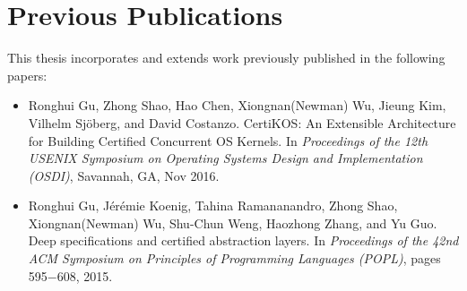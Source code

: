 

\chapter*{Previous Publications}
\thispagestyle{empty}

This thesis incorporates and extends work previously
published in the following papers:

\begin{itemize}

\item Ronghui Gu, Zhong Shao, Hao Chen, Xiongnan(Newman) Wu, Jieung Kim, 
Vilhelm Sj\"{o}berg,
and David Costanzo.
  CertiKOS: An Extensible Architecture for Building Certified
              Concurrent OS Kernels.
  In {\em Proceedings of the 12th USENIX Symposium on Operating Systems
  Design and Implementation (OSDI)}, Savannah, GA, Nov
  2016.
  
\item 
Ronghui Gu, J\'{e}r\'{e}mie Koenig, Tahina Ramananandro, Zhong Shao, Xiongnan(Newman) Wu, Shu-Chun Weng, Haozhong Zhang, and Yu Guo. Deep
specifications and certified abstraction layers. In {\em Proceedings of the 42nd ACM Symposium
on Principles of Programming Languages (POPL)}, pages 595$-$608, 2015.~\cite{dscal15}

\end{itemize}

\clearpage
